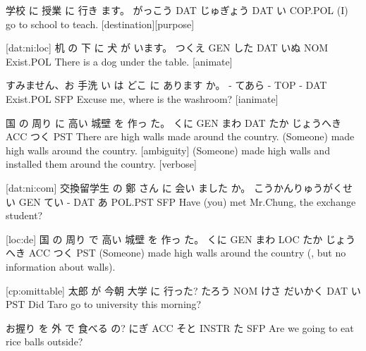 学校    に   授業      に  行き ます。
がっこう DAT じゅぎょう DAT い COP.POL
(I) go to school to teach. [destination][purpose]

[dat:ni:loc]
机    の   下  に   犬   が   います。
つくえ GEN した DAT いぬ NOM Exist.POL
There is a dog under the table. [animate]

すみません、お 手洗 い は どこ に  あります    か。
-          てあら - TOP -  DAT Exist.POL SFP
Excuse me, where is the washroom? [ianimate]

国   の  周り  に  高い 城壁      を  作っ た。
くに GEN まわ DAT たか じょうへき ACC つく PST
There are high walls made around the country.
(Someone) made high walls around the country. [ambiguity]
(Someone) made high walls and installed them around the country. [verbose]

[dat:ni:com]
交換留学生           の  鄭 さん に 会い ました    か。
こうかんりゅうがくせい GEN てい - DAT あ  POL.PST SFP
Have (you) met Mr.Chung, the exchange student?

[loc:de]
国   の  周り  で  高い 城壁      を  作っ た。
くに GEN まわ LOC たか じょうへき ACC つく PST
(Someone) made high walls around the country (, but no information about walls).

[cp:omittable]
太郎   が  今朝 大学    に   行った?
たろう NOM けさ だいかく DAT い PST
Did Taro go to university this morning?

お握り を   外  で      食べる の?
にぎ   ACC そと INSTR  た SFP
Are we going to eat rice balls outside?
